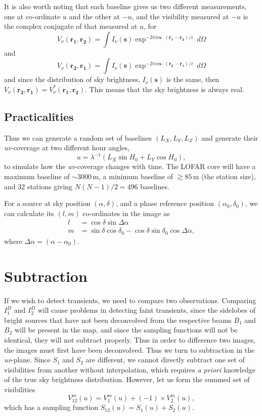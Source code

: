 \documentclass{article}
\begin{document}
It is also worth noting that each baseline gives us two different
measurements, one at co-ordinate $u$ and the other at $-u$, and the
visibility measured at $-u$ is the complex conjugate of that measured
at $u$, for
\begin{equation}
V_{\nu}(\mathbf{r_1,r_2}) = \int I_{\nu}(\mathbf{s})\exp^{-2\pi i \nu
  \mathbf{s}\cdot(\mathbf{r_1-r_2})/c}\,d\Omega
\end{equation}
and
\begin{equation}
V_{\nu}(\mathbf{r_2,r_1}) = \int I_{\nu}(\mathbf{s})\exp^{-2\pi i \nu
  \mathbf{s}\cdot(\mathbf{r_2-r_1})/c}\,d\Omega
\end{equation}
and since the distribution of sky brightness, $I_{\nu}(\mathbf{s})$ is
the same, then $V_{\nu}(\mathbf{r_2,r_1}) =
V_{\nu}^{\ast}(\mathbf{r_1,r_2})$.  This means that the sky brightness
is always real.

\subsection{Practicalities}
Thus we can generate a random set of baselines $(L_X,L_Y,L_Z)$ and
generate their {\it uv}-coverage at two different hour angles,
\begin{equation}
u = \lambda^{-1}(L_X\sin H_0 + L_Y \cos H_0),
\end{equation}
to simulate how the {\it uv}-coverage changes with time.  The LOFAR
core will have a maximum baseline of $\sim 3000$\,m, a minimum
baseline of $\gtrsim 85$\,m (the station size), and 32 stations giving
$N(N-1)/2 = 496$ baselines.

For a source at sky position $(\alpha,\delta)$, and a phase reference
position $(\alpha_0,\delta_0)$, we can calculate its $(l,m)$
co-ordinates in the image as
\begin{align}
l &= \cos\delta\sin\Delta\alpha\\
m &= \sin\delta\cos\delta_0 - \cos\delta\sin\delta_0\cos\Delta\alpha,
\end{align}
where $\Delta\alpha = (\alpha-\alpha_0)$.

\section{Subtraction}
If we wish to detect transients, we need to compare two observations.
Comparing $I_1^D$ and $I_2^D$ will cause problems in detecting faint
transients, since the sidelobes of bright sources that have not been
deconvolved from the respective beams $B_1$ and $B_2$ will be present
in the map, and since the sampling functions will not be identical,
they will not subtract properly.  Thus in order to difference two
images, the images must first have been deconvolved.  Thus we turn to
subtraction in the {\it uv}-plane.  Since $S_1$ and $S_2$ are
different, we cannot directly subtract one set of visibilities from
another without interpolation, which requires {\it a priori} knowledge
of the true sky brightness distribution.  However, let us form the
summed set of visibilities 
\begin{equation}
V^m_{12}(u) = V^m_1(u) + (-1)\times V^m_2(u),
\end{equation}
which has a sampling function $S_{12}(u) = S_1(u)+S_2(u)$.
\end{document}
